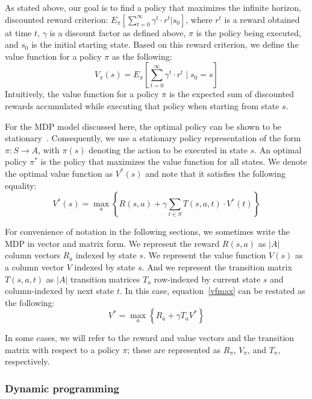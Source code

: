 As stated above, our goal is to find a policy that maximizes the
infinite horizon, discounted reward criterion: 
$E_{\pi}[\sum_{t=0}^{\infty} \gamma^t \cdot r^t | s_0]$, 
where $r^t$ is a reward obtained at
time $t$, $\gamma$ is a discount factor as defined above, $\pi$ is the
policy being executed, and $s_0$ is the initial starting state.  Based
on this reward criterion, we define the value function for a policy $\pi$
as the following:
\begin{equation}
V_{\pi}(s) = E_{\pi} \left[ \sum_{t=0}^{\infty} \gamma^t \cdot r^t \; \Big| \; s_0 = s \right] \label{vf}
\end{equation}
Intuitively, the value function for a policy $\pi$ is the expected 
sum of discounted rewards accumulated while executing that policy when
starting from state $s$.

For the MDP model discussed here, the optimal policy can be shown to
be stationary~\cite{Puterman}.
Consequently, we use a stationary policy representation of the form
$\pi: S \rightarrow A$, with $\pi(s)$ denoting the action to be
executed in state $s$.  An optimal
policy $\pi^*$ is the policy that maximizes the value function for all states.
We denote the optimal value function as
$V^*(s)$ and note that it satisfies the following equality:
\begin{equation}
V^*(s) = \max_{a} \left\{ R(s,a) + \gamma \sum_{t \in S} T(s,a,t) \cdot V^*(t) \right\} \label{vfmax}
\end{equation}

For convenience of notation in the following sections, we sometimes
write the MDP in vector and matrix form.  We represent the reward $R(s,a)$ 
as $|A|$ column vectors $R_{a}$ indexed by state $s$.  We represent
the value function $V(s)$ as a column vector $V$ indexed by state $s$.  And
we represent the transition matrix $T(s,a,t)$ as $|A|$ transition matrices
$T_{a}$ row-indexed by current state $s$ and column-indexed by
next state $t$.  In this case, 
equation~\ref{vfmax} can be restated as the following:
\begin{equation}
V^{*} = \max_{a} \left\{ R_a + \gamma T_a V^* \right\}
\end{equation}

In some cases, we will refer to the reward and value vectors and the
transition matrix with respect to a policy
$\pi$; these are represented as $R_{\pi}$, $V_{\pi}$, and $T_{\pi}$,
respectively.

\subsubsection{Dynamic programming}

